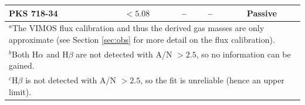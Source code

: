 \documentclass[a4paper,fleqn,usenatbib]{mnras}
\begin{document}
\begin{table}
\begin{tabular}{l c c c c}
			PKS 718-34  & $< 5.08$	 		& -- 		& -- & Passive \\
			\hline
			\hline
			\multicolumn{5}{L{.7\linewidth}}{$^{a}$The VIMOS flux calibration and thus the derived gas masses are only approximate (see Section \ref{sec:obs} for more detail on the flux calibration).} \\
			\multicolumn{5}{L{.7\linewidth}}{$^{b}$Both H$\alpha$ and H$\beta$ are not detected with A/N $>2.5$, so no information can be gained.} \\
			\multicolumn{5}{L{.7\linewidth}}{$^{c}$H$\beta$ is not detected with A/N $> 2.5$, so the fit is unreliable (hence an upper limit).}
		\end{tabular}
	\end{table}
\end{document}
